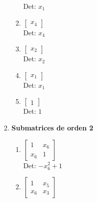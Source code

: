 \documentclass[12pt]{article}
\begin{document}
\begin{enumerate}
\begin{enumerate}
\begin{enumerate}
Det: $x_{1}$\\


\item $\displaystyle \left[\begin{matrix}x_{4}\end{matrix}\right]$\\

Det: $x_{4}$\\


\item $\displaystyle \left[\begin{matrix}x_{2}\end{matrix}\right]$\\

Det: $x_{2}$\\


\item $\displaystyle \left[\begin{matrix}x_{1}\end{matrix}\right]$\\

Det: $x_{1}$\\


\item $\displaystyle \left[\begin{matrix}1\end{matrix}\right]$\\

Det: $1$\\

\end{enumerate}

\item {\bf Submatrices de orden 2}\\

\begin{enumerate}


\item $\displaystyle \left[\begin{matrix}1 & x_{6}\\x_{6} & 1\end{matrix}\right]$\\

Det: $- x_{6}^{2} + 1$\\


\item $\displaystyle \left[\begin{matrix}1 & x_{5}\\x_{6} & x_{3}\end{matrix}\right]$\\


\end{enumerate}
\end{enumerate}
\end{enumerate}
\end{document}
